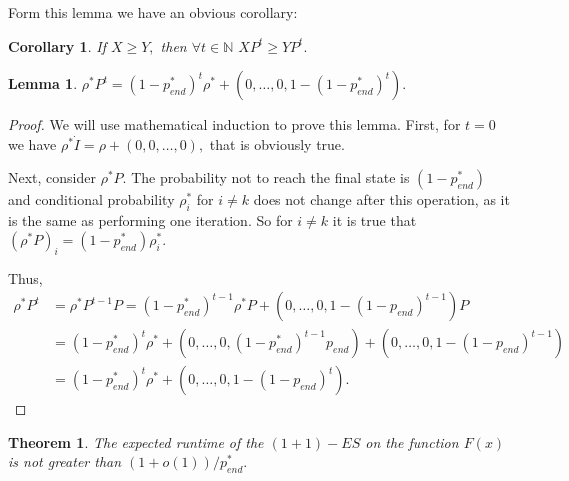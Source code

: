 \documentclass{article}
\newtheorem{theorem}{Theorem}
\newtheorem{lemma}{Lemma}
\newtheorem{corollary}{Corollary}
\begin{document}
Form this lemma we have an obvious corollary:
\begin{corollary}\label{P_t}
If $X \ge Y,$ then $\forall t \in \mathbb{N}$ $X P^t \ge Y P^t.$
\end{corollary}

\begin{lemma}\label{pi_R}
$\rho^* P^t = (1 - p_{end}^*)^t \rho^* + (0, \dots, 0, 1 - (1 - p_{end}^*)^t).$
\end{lemma}
\begin{proof}
  We will use mathematical induction to prove this lemma. First, for $t = 0$ we have $\rho^* \dot I = \rho + (0, 0, \dots, 0),$ that is obviously true.

  Next, consider $\rho^* P.$ The probability not to reach the final state is $(1 - p_{end}^*)$ and conditional probability $\rho_i^*$ for $i \ne k$ does not change after this operation, as it is the same as performing one iteration. So for $i \ne k$ it is true that $(\rho^* P)_i = (1 - p_{end}^*) \rho_i^*.$

  Thus,
  \begin{align*}
    \rho^* P^t &= \rho^* P^{t - 1} P = (1 - p_{end}^*)^{t - 1} \rho^* P + (0, \dots, 0, 1 - (1 - p_{end})^{t - 1}) P \\
    &= (1 - p_{end}^*)^t \rho^* + (0, \dots, 0, (1 - p_{end}^*)^{t - 1} p_{end}) + (0, \dots, 0, 1 - (1 - p_{end})^{t - 1}) \\
    &= (1 - p_{end}^*)^t \rho^* + (0, \dots, 0, 1 - (1 - p_{end})^t).
  \end{align*}
\end{proof}

\begin{theorem}\label{th_up}
  The expected runtime of the $(1 + 1)-ES$ on the function $F(x)$ is not greater than $(1 + o(1))/p_{end}^*.$
\end{theorem}
\end{document}
